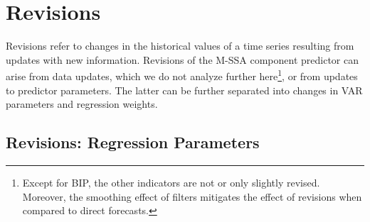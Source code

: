\documentclass[a4paper]{article}
\begin{document}
\section{Revisions}\label{revisions}



Revisions refer to changes in the historical values of a time series resulting from updates with new information. Revisions of the M-SSA component predictor can arise from data updates, which we do not analyze further here\footnote{Except for BIP, the other indicators are not or only slightly revised. Moreover, the smoothing effect of filters mitigates the effect of revisions when compared to direct forecasts.}, or from updates to predictor parameters. The latter can be further separated into changes in VAR parameters and regression weights. 
\subsection{Revisions: Regression Parameters}
\end{document}
